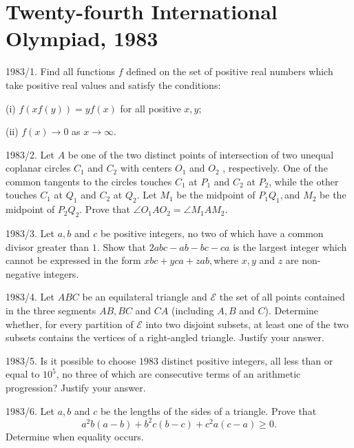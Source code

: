 \documentclass[12pt,thmsa]{article}
\begin{document}
\section{Twenty-fourth International Olympiad, 1983}

1983/1. Find all functions $f$ defined on the set of positive real numbers
which take positive real values and satisfy the conditions:

(i) $f(xf(y))=yf(x)$ for all positive $x,y;$

(ii) $f(x)\rightarrow 0$ as $x\rightarrow \infty .$

1983/2. Let $A$ be one of the two distinct points of intersection of two
unequal coplanar circles $C_{1}$ and $C_{2}$ with centers $O_{1}$ and $O_{2}$%
, respectively. One of the common tangents to the circles touches $C_{1}$ at 
$P_{1}$ and $C_{2}$ at $P_{2}$, while the other touches $C_{1}$ at $Q_{1}$
and $C_{2}$ at $Q_{2}$. Let $M_{1}$ be the midpoint of $P_{1}Q_{1},$and $%
M_{2}$ be the midpoint of $P_{2}Q_{2}$. Prove that $\angle
O_{1}AO_{2}=\angle M_{1}AM_{2}$.

1983/3. Let $a,b$ and $c$ be positive integers, no two of which have a
common divisor greater than $1.$ Show that $2abc-ab-bc-ca$ is the largest
integer which cannot be expressed in the form $xbc+yca+zab,$where $x,y$ and $%
z$ are non-negative integers.

1983/4. Let $ABC$ be an equilateral triangle and $\mathcal{E}$ the set of
all points contained in the three segments $AB,BC$ and $CA$ (including $A,B$
and $C$). Determine whether, for every partition of $\mathcal{E}$ into two
disjoint subsets, at least one of the two subsets contains the vertices of a
right-angled triangle. Justify your answer.

1983/5. Is it possible to choose $1983$ distinct positive integers, all less
than or equal to $10^{5}$, no three of which are consecutive terms of an
arithmetic progression? Justify your answer.

1983/6. Let $a,b$ and $c$ be the lengths of the sides of a triangle. Prove
that 
\[
a^{2}b(a-b)+b^{2}c(b-c)+c^{2}a(c-a)\geq 0.
\]
Determine when equality occurs.
\end{document}
